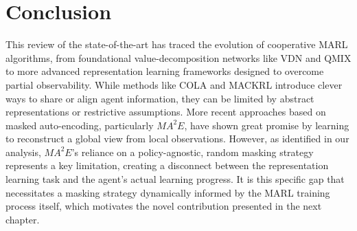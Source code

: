 \section*{Conclusion}
This review of the state-of-the-art has traced the evolution of cooperative MARL algorithms, from foundational value-decomposition networks like VDN and QMIX to more advanced representation learning frameworks designed to overcome partial observability. While methods like COLA and MACKRL introduce clever ways to share or align agent information, they can be limited by abstract representations or restrictive assumptions. More recent approaches based on masked auto-encoding, particularly ${MA}^2E$, have shown great promise by learning to reconstruct a global view from local observations. However, as identified in our analysis, ${MA}^2E$'s reliance on a policy-agnostic, random masking strategy represents a key limitation, creating a disconnect between the representation learning task and the agent's actual learning progress. It is this specific gap that necessitates a masking strategy dynamically informed by the MARL training process itself, which motivates the novel contribution presented in the next chapter.


